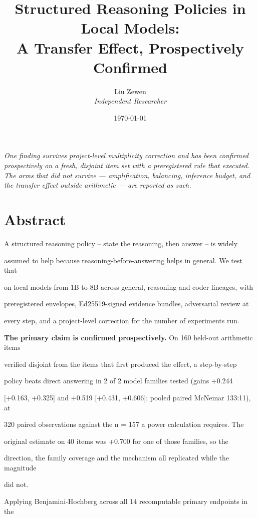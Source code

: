 \documentclass[11pt]{article}
\title{Structured Reasoning Policies in Local Models:\\A Transfer Effect, Prospectively Confirmed}
\author{Liu Zewen\\{\small \textit{Independent Researcher}}}
\date{\today}
\begin{document}
\maketitle

\begin{center}\begin{minipage}{0.92\textwidth}\small\it
One finding survives project-level multiplicity correction and has been confirmed
prospectively on a fresh, disjoint item set with a preregistered rule that executed.
The arms that did not survive --- amplification, balancing, inference budget, and the
transfer effect outside arithmetic --- are reported as such.
\end{minipage}\end{center}
\vspace{1em}

\section*{Abstract}

A structured reasoning policy -- state the reasoning, then answer -- is widely

assumed to help because reasoning-before-answering helps in general. We test that

on local models from 1B to 8B across general, reasoning and coder lineages, with

preregistered envelopes, Ed25519-signed evidence bundles, adversarial review at

every step, and a project-level correction for the number of experiments run.


{\bf The primary claim is confirmed prospectively.} On 160 held-out arithmetic items

verified disjoint from the items that first produced the effect, a step-by-step

policy beats direct answering in 2 of 2 model families tested (gains +0.244

[+0.163, +0.325] and +0.519 [+0.431, +0.606]; pooled paired McNemar 133:11), at

320 paired observations against the n = 157 a power calculation requires. The

original estimate on 40 items was +0.700 for one of those families, so the

direction, the family coverage and the mechanism all replicated while the magnitude

did not.


Applying Benjamini-Hochberg across all 14 recomputable primary endpoints in the
\end{document}
